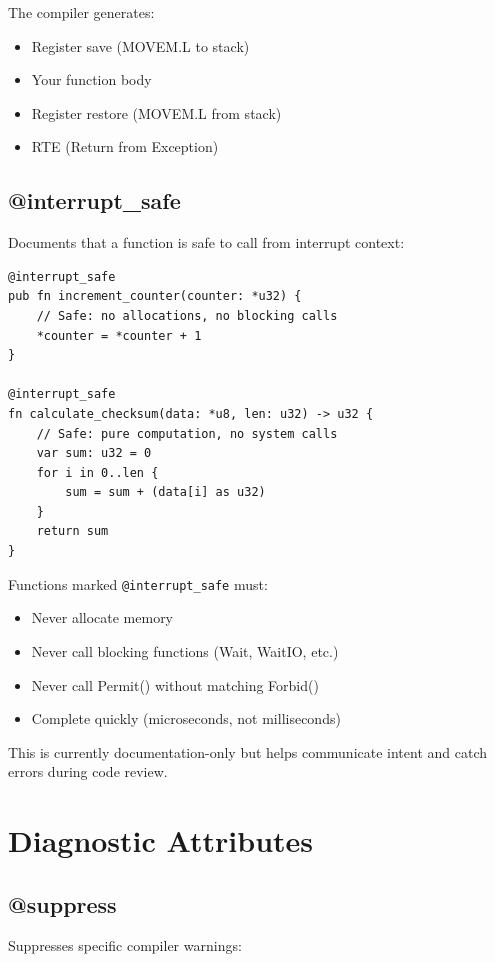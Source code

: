The compiler generates:
\begin{itemize}
    \item Register save (MOVEM.L to stack)
    \item Your function body
    \item Register restore (MOVEM.L from stack)
    \item RTE (Return from Exception)
\end{itemize}

\subsection{@interrupt\_safe}

Documents that a function is safe to call from interrupt context:

\begin{lstlisting}
@interrupt_safe
pub fn increment_counter(counter: *u32) {
    // Safe: no allocations, no blocking calls
    *counter = *counter + 1
}

@interrupt_safe
fn calculate_checksum(data: *u8, len: u32) -> u32 {
    // Safe: pure computation, no system calls
    var sum: u32 = 0
    for i in 0..len {
        sum = sum + (data[i] as u32)
    }
    return sum
}
\end{lstlisting}

Functions marked \texttt{@interrupt\_safe} must:
\begin{itemize}
    \item Never allocate memory
    \item Never call blocking functions (Wait, WaitIO, etc.)
    \item Never call Permit() without matching Forbid()
    \item Complete quickly (microseconds, not milliseconds)
\end{itemize}

This is currently documentation-only but helps communicate intent and catch errors during code review.

\section{Diagnostic Attributes}
\label{sec:diagnostic-attributes}

\subsection{@suppress}

Suppresses specific compiler warnings:

